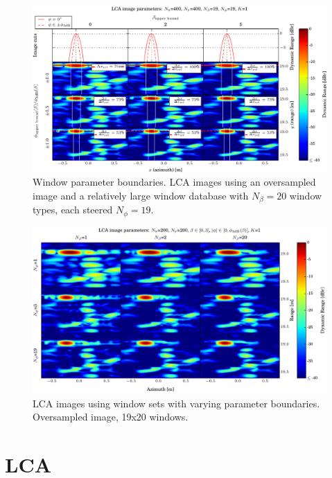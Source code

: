 \documentclass[10pt,journal,draftclsnofoot,onecolumn]{IEEEtran}
\let\MYoriglatexcaption\caption               %
\renewcommand{\caption}[2][\relax]{\MYoriglatexcaption[#2]{#2}}
\newcommand\1{\vec 1}
\begin{document}
\begin{figure}[t]%
\includegraphics[width=\textwidth]{gfx/oversampling_mosaic_bounds.pdf}%
\caption{Window parameter boundaries. LCA images using an oversampled image and a relatively large window database with $N_\beta=20$ window types, each steered $N_\phi=19$. }\label{oversampling_mosaic_bounds}
\end{figure}

\begin{figure}[t]%
\includegraphics[width=\textwidth]{gfx/oversampling_mosaic.pdf}%
\caption{LCA images using window sets with varying parameter boundaries. Oversampled image, 19x20 windows.}\label{oversampling_mosaic}
\end{figure}


\section{LCA}
\end{document}

